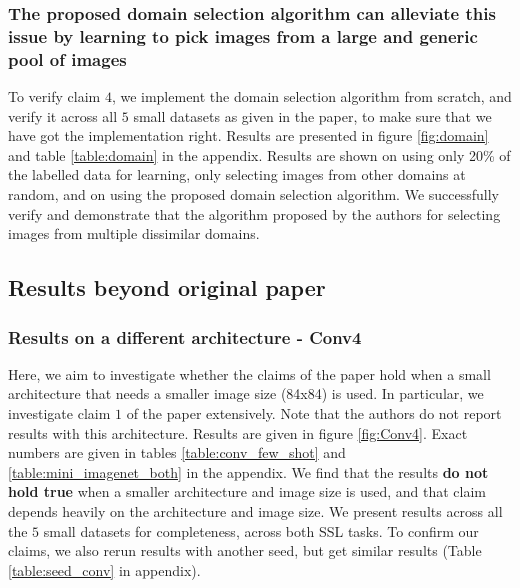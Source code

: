 

\subsubsection{The proposed domain selection algorithm can alleviate this issue by learning to pick images from a large and generic pool of images}

To verify claim $4$, we implement the domain selection algorithm from scratch, and verify it across all $5$ small datasets as given in the paper, to make sure that we have got the implementation right. Results are presented in figure \ref{fig:domain} and table \ref{table:domain} in the appendix. Results are shown on using only 20\% of the labelled data for learning, only selecting images from other domains at random, and on using the proposed domain selection algorithm. We successfully verify and demonstrate that the algorithm proposed by the authors for selecting images from multiple dissimilar domains.

    

\subsection{Results beyond original paper}

\label{subsubsec:conv4}
\subsubsection{Results on a different architecture - Conv4}

Here, we aim to investigate whether the claims of the paper hold when a small architecture that needs a smaller image size (84x84) is used. In particular, we investigate claim $1$ of the paper extensively. Note that the authors do not report results with this architecture. Results are given in figure \ref{fig:Conv4}. Exact numbers are given in tables \ref{table:conv_few_shot} and \ref{table:mini_imagenet_both} in the appendix. We find that the results \textbf{do not hold true} when a smaller architecture and image size is used, and that claim depends heavily on the architecture and image size. We present results across all the $5$ small datasets for completeness, across both SSL tasks. To confirm our claims, we also rerun results with another seed, but get similar results (Table \ref{table:seed_conv} in appendix).  

